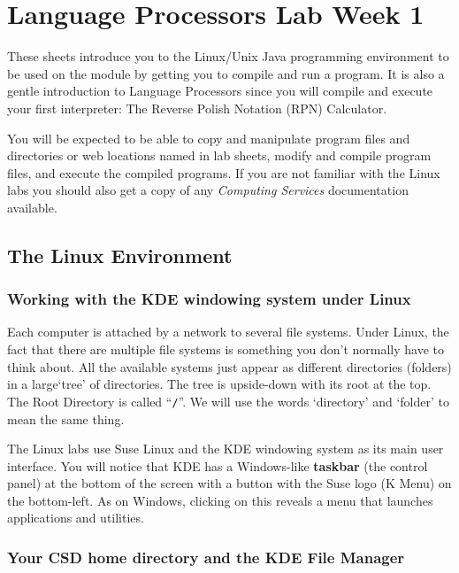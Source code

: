 \documentclass{article}
\begin{document}
\thispagestyle{empty}

\newcommand{\negra}[1]{\textbf{#1}}

\section*{Language Processors Lab Week 1}


\medskip\noindent These sheets introduce you to the Linux/Unix Java programming environment to be used on the module by getting you to compile and run a program. It is also a gentle introduction to Language Processors since you will compile and execute your first interpreter: The Reverse Polish Notation (RPN) Calculator.

\medskip\noindent You will be expected to be able to copy and manipulate program files and directories or web locations named in lab sheets, modify and compile program files, and execute the compiled programs.
If you are not familiar with the Linux labs you should also get a copy of any
\emph{Computing Services} documentation available.


\subsection*{The Linux Environment}


\subsubsection*{Working with the KDE windowing system under Linux}

Each computer is attached by a network to several file systems. Under Linux, the fact that there are multiple file systems is something you don't normally have to think about. All the available systems just appear as different directories (folders) in a large`tree' of directories. The tree is upside-down with its root at the top. The Root Directory is called ``{\tt /}''. We will use the words `directory' and `folder' to mean the same thing.

The Linux labs use Suse Linux and the KDE windowing system as its main user interface.
You will notice that KDE has a Windows-like \negra{taskbar} (the control panel) at the bottom of the screen with a button with the Suse logo (K Menu) on the bottom-left. As on Windows, clicking on this reveals a menu that launches applications and utilities.

\subsubsection*{Your CSD home directory and the KDE File Manager}
\end{document}
